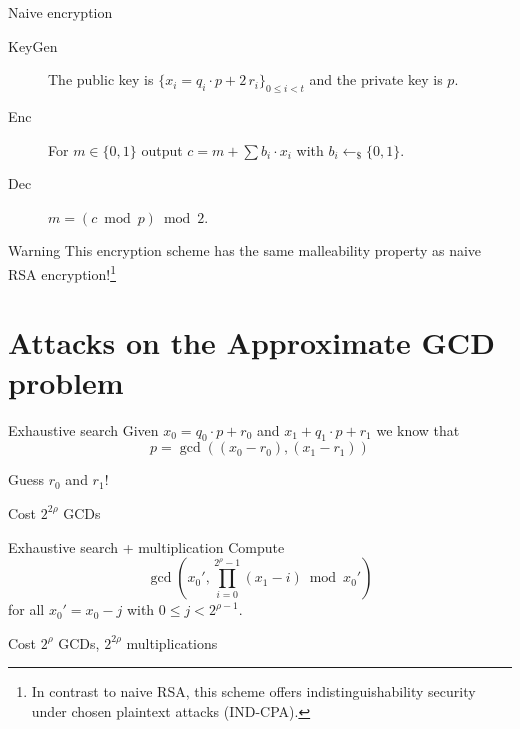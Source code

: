\documentclass[presentation,smaller]{beamer}
\newcommand{\sample}{\ensuremath{\leftarrow_{\$}}}
\begin{document}
\begin{frame}[label={sec:orgheadline23}]{Naive encryption}
\begin{description}
\item[{KeyGen}] The public key is \(\{x_i = q_i ⋅ p + 2\,r_i\}_{0 ≤ i < t}\) and the private key is \(p\).

\item[{Enc}] For \(m \in \{0,1\}\) output \(c = m + \sum b_i ⋅ x_i\) with \(b_i \sample \{0,1\}\).

\item[{Dec}] \(m = (c \bmod p) \bmod 2\).
\end{description}

\pause

\begin{block}{Warning}
This encryption scheme has the same malleability property as naive RSA encryption!\footnote{In contrast to naive RSA, this scheme offers indistinguishability security under chosen plaintext attacks (IND-CPA).}
\end{block}
\end{frame}

\section{Attacks on the Approximate GCD problem}
\label{sec:orgheadline34}

\begin{frame}[label={sec:orgheadline25}]{Exhaustive search}
Given \(x_0 = q_0 ⋅ p + r_0\) and \(x_1 + q_1 ⋅ p + r_1\) we know that \[p = \gcd\left((x_0 - r_0), (x_1 - r_1)\right)\]


Guess \(r_0\) and \(r_1\)!

\begin{block}{Cost}
\(2^{2ρ}\) GCDs
\end{block}
\end{frame}

\begin{frame}[label={sec:orgheadline26}]{Exhaustive search + multiplication}
Compute \[\gcd\left(x_0', \prod_{i=0}^{2^ρ-1} (x_1 - i) \bmod x_0'\right)\] for all \(x_0' = x_0 - j\) with \(0 \leq j < 2^{ρ-1}\).

\begin{block}{Cost}
\(2^ρ\) GCDs, \(2^{2ρ}\) multiplications
\end{block}
\end{frame}
\end{document}
